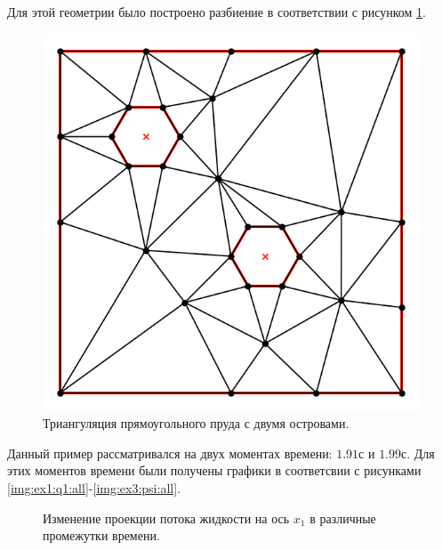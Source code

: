 \documentclass[14pt]{extreport}
\begin{document}
Для этой геометрии было построено разбиение в соответствии с рисунком \ref{img:ex3:mesh}.

\begin{figure}[H]
\centerline{
\includegraphics[width=0.5\linewidth]{images/ex3/mesh}}
\caption{Триангуляция прямоугольного пруда с двумя островами.}
\label{img:ex3:mesh}
\end{figure}

Данный пример рассматривался на двух моментах времени: $1.91$с и $1.99$с. Для этих моментов времени были получены графики в соответсвии с рисунками \ref{img:ex1:q1:all}-\ref{img:ex3:psi:all}.

\begin{figure}[H]
  \centering
  \hfill
  \caption{Изменение проекции потока жидкости на ось $x_1$ в различные промежутки времени.}
  \label{img:ex3:q1:all}
\end{figure}
\end{document}
